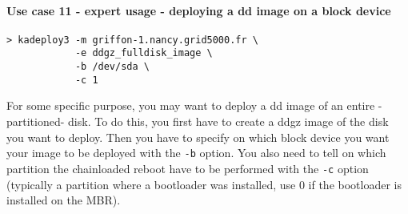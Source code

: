 \documentclass[a4wide,10pt,oneside]{book}
\begin{document}
\paragraph{Use case 11 - expert usage - deploying a dd image on a block device}
\begin{verbatim}
> kadeploy3 -m griffon-1.nancy.grid5000.fr \
            -e ddgz_fulldisk_image \
            -b /dev/sda \
            -c 1
\end{verbatim}

For some specific purpose, you may want to deploy a dd image of an entire -partitioned- disk. To do this, you first have to create a ddgz image of the disk you want to deploy. Then you have to specify on which block device you want your image to be deployed with the \texttt{-b} option. You also need to tell on which partition the chainloaded reboot have to be performed with the \texttt{-c} option (typically a partition where a bootloader was installed, use 0 if the bootloader is installed on the MBR).
\end{document}
